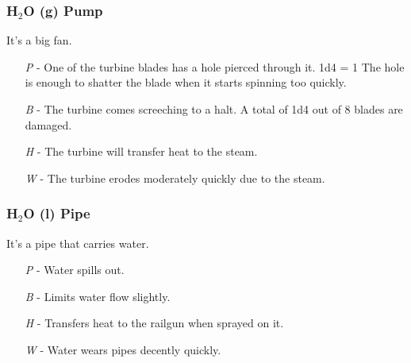 \documentclass[a4paper]{article}
\begin{document}
\vspace{-0.5cm} \hspace{-18pt} \subsubsection{H$_2$O (g) Pump} \label{railgun_h2o_g_pump} \vspace{-0.2cm}
It's a big fan.
\begin{enumerate}
\item [\textit{P}] - One of the turbine blades has a hole pierced through it. \newline \hspace*{3pt} 1d4 = 1 The hole is enough to shatter the blade when it starts spinning too quickly. 
\item [\textit{B}] - The turbine comes screeching to a halt. A total of 1d4 out of 8 blades are damaged.
\item [\textit{H}] - The turbine will transfer heat to the steam. 
\item [\textit{W}] - The turbine erodes moderately quickly due to the steam.
\end{enumerate}

\vspace{-0.5cm} \hspace{-18pt} \subsubsection{H$_2$O (l) Pipe} \label{railgun_h2o_pipe} \vspace{-0.2cm}
It's a pipe that carries water.
\begin{enumerate}
\item [\textit{P}] - Water spills out.
\item [\textit{B}] - Limits water flow slightly.
\item [\textit{H}] - Transfers heat to the railgun when sprayed on it.
\item [\textit{W}] - Water wears pipes decently quickly.
\end{enumerate}
\end{document}
